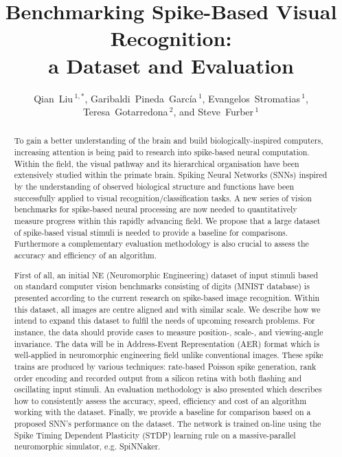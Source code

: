 \documentclass[pdftex]{bioinfo}
\def\firstAuthorLast{Qian Liu {et~al.}} %
\def\Authors{Qian~Liu\,$^{1,*}$, Garibaldi~Pineda~García\,$^{1}$, Evangelos~Stromatias\,$^{1}$, Teresa~Gotarredona\,$^{2}$, and Steve~Furber\,$^{1}$}
\def\Address{$^{1}$SpiNNaker, Advanced Processor Technologies Research Group, School of Computer Science, University of Manchester, Manchester, United Kingdom\\
$^{2}$Instituto de Microelectrónica de Sevilla (IMSE-
CNM-CSIC), Sevilla, Spain }
\begin{document}

\title[Benchmarking Spike-Based Visual Recognition: a Dataset and Evaluation]{Benchmarking  Spike-Based Visual Recognition:\\ a Dataset and Evaluation}
\author[\firstAuthorLast ]{\Authors}
\address{\Address}
\history{}

\editor{}


\maketitle
\begin{abstract}
To gain a better understanding of the brain and build biologically-inspired computers, increasing attention is being paid to research into spike-based neural computation.
Within the field, the visual pathway and its hierarchical organisation have been extensively studied within the primate brain.
Spiking Neural Networks (SNNs) inspired by the understanding of observed biological structure and functions have been successfully applied to visual recognition/classification tasks.
A new series of vision benchmarks for spike-based neural processing are now needed to quantitatively measure progress within this rapidly advancing field.
We propose that a large dataset of spike-based visual stimuli is needed to provide a baseline for comparisons.
Furthermore a complementary evaluation methodology is also crucial to assess the accuracy and efficiency of an algorithm.

First of all, an initial NE (Neuromorphic Engineering) dataset of input stimuli based on standard computer vision benchmarks consisting of %
digits (MNIST database) is presented according to the current research on spike-based image recognition.
Within this dataset, all images are centre aligned and with similar scale.
We describe how we intend to expand this dataset to fulfil the needs of upcoming research problems.
For instance, the data should provide cases to measure position-, scale-, and viewing-angle invariance.
The data will be in Address-Event Representation (AER) format which is well-applied in neuromorphic engineering field unlike conventional images.
These spike trains are produced by various techniques: rate-based Poisson spike generation, rank order encoding and recorded output from a silicon retina with both flashing and oscillating input stimuli.
An evaluation methodology is also presented which describes how to consistently assess the accuracy, speed, efficiency and cost of an algorithm working with the dataset.
Finally, we provide a baseline for comparison based on a proposed SNN's performance on the dataset.
The network is trained on-line using the Spike Timing Dependent Plasticity (STDP) learning rule on a massive-parallel neuromorphic simulator, e.g. SpiNNaker.


\end{abstract}
\end{document}
